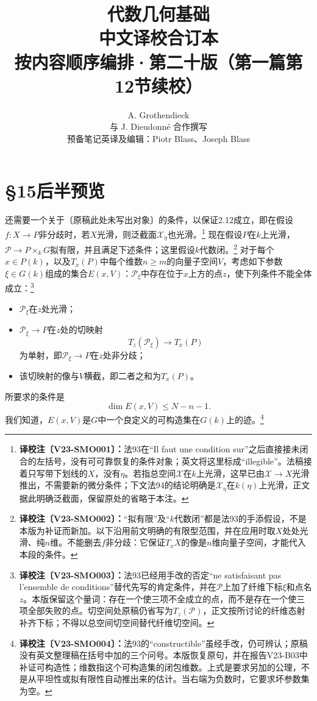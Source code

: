 \documentclass[UTF8,a4paper]{ctexbook}
\title{代数几何基础\\中文译校合订本\\[1em]\large 按内容顺序编排·第二十版（第一篇第12节续校）}
\author{A. Grothendieck\\与 J. Dieudonné 合作撰写\\[.6em]\normalsize 预备笔记英译及编辑：Piotr Blass、Joseph Blass}
\date{}
\newcommand{\cmt}[2]{\footnote{\textbf{译校注〔#1〕：}#2}}
\newcommand{\egasection}[1]{\section*{#1}\addcontentsline{toc}{section}{#1}}
\begin{document}
\egasection{§15后半预览}
还需要一个关于〔原稿此处未写出对象〕的条件，以保证2.12成立，即在假设$f:X\to P$非分歧时，若$X$光滑，则泛截面$\mathcal X_\eta$也光滑。\cmt{V23-SMO001}{法93在“Il faut une condition sur”之后直接接未闭合的左括号，没有可可靠恢复的条件对象；英文将这里标成“illegible”。法稿接着只写带下划线的$X$，没有$\eta$。若指总空间$\mathcal X$在$k$上光滑，这早已由$\mathcal X\to X$光滑推出，不需要新的微分条件；下文法94的结论明确是$\mathcal X_\eta$在$k(\eta)$上光滑，正文据此明确泛截面，保留原处的省略于本注。}
现在假设$P$在$k$上光滑，$\mathcal P\to P\times_kG$拟有限，并且满足下述条件；这里假设$k$代数闭。\cmt{V23-SMO002}{“拟有限”及“$k$代数闭”都是法93的手添假设，不是本版为补证而新加。以下沿用前文明确的有限型范围，并在应用时取$X$处处光滑、纯$n$维。不能删去$f$非分歧：它保证$T_xX$的像是$n$维向量子空间，才能代入本段的条件。}
对于每个$x\in P(k)$，以及$T_x(P)$中每个维数$n\geq m$的向量子空间$V$，考虑如下参数$\xi\in G(k)$组成的集合$E(x,V)$：$\mathcal P_\xi$中存在位于$x$上方的点$z$，使下列条件不能全体成立：\cmt{V23-SMO003}{法93已经用手改的否定“ne satisfaisant pas l'ensemble de conditions”替代先写的肯定条件，并在$\mathcal P$上加了纤维下标$\xi$和点名$z$。本版保留这个量词：存在一个使三项不全成立的点，而不是存在一个使三项全部失败的点。切空间处原稿仍省写为$T_z(\mathcal P)$，正文按所讨论的纤维态射补齐下标；不得以总空间切空间替代纤维切空间。}
\begin{itemize}
\item $\mathcal P_\xi$在$z$处光滑；
\item $\mathcal P_\xi\to P$在$z$处的切映射
\[
T_z(\mathcal P_\xi)\longrightarrow T_x(P)
\]
为单射，即$\mathcal P_\xi\to P$在$z$处非分歧；
\item 该切映射的像与$V$横截，即二者之和为$T_x(P)$。
\end{itemize}

所要求的条件是
\[
\dim E(x,V)\leq N-n-1.
\]
我们知道，$E(x,V)$是$G$中一个良定义的可构造集在$G(k)$上的迹。\cmt{V23-SMO004}{法93的“constructible”虽经手改，仍可辨认；原稿没有英文整理稿在括号中加的三个问号。本版恢复原句，并在报告V23-B03中补证可构造性；维数指这个可构造集的闭包维数。上式是要求另加的公理，不是从平坦性或拟有限性自动推出来的估计。当右端为负数时，它要求坏参数集为空。}
\end{document}
